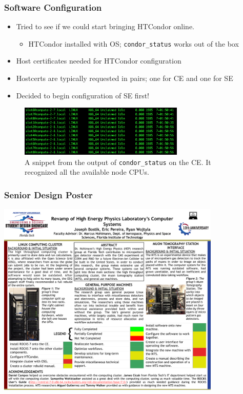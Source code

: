 \documentclass{beamer}
\begin{document}
\begin{frame}

  \frametitle{Software Configuration}

  \begin{itemize}
    \item Tried to see if we could start bringing HTCondor online.
      \begin{itemize}
        \item HTCondor installed with OS; {\tt condor\_status} works out of the box
      \end{itemize}
    \item Host certificates needed for HTCondor configuration
    \item Hostcerts are typically requested in pairs; one for CE and one for SE
    \item Decided to begin configuration of SE first!
  \end{itemize}

  \begin{figure}[H]
    \begin{center}
      \includegraphics[width=0.7\textwidth]{condorStatus.png}
    \end{center}
    \caption{A snippet from the output of {\tt condor\_status} on the CE. It
      recognized all the available node CPUs.}
  \end{figure}

\end{frame}



\begin{frame}
  
  \frametitle{Senior Design Poster}

  \begin{center}
    \includegraphics[width=0.8\textwidth]{poster.pdf}
  \end{center}

\end{frame}

\end{document}
